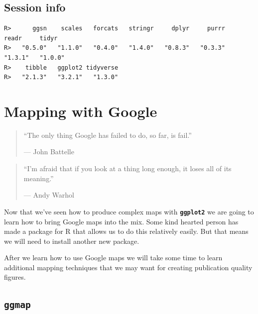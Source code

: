 \documentclass[
]{book}
\newenvironment{Shaded}{\begin{snugshade}}{\end{snugshade}}
\newcommand{\KeywordTok}[1]{\textcolor[rgb]{0.13,0.29,0.53}{\textbf{#1}}}
\newcommand{\NormalTok}[1]{#1}
\newcommand{\OperatorTok}[1]{\textcolor[rgb]{0.81,0.36,0.00}{\textbf{#1}}}
\newcommand{\StringTok}[1]{\textcolor[rgb]{0.31,0.60,0.02}{#1}}
\begin{document}
\hypertarget{session-info-7}{%
\section{Session info}\label{session-info-7}}

\begin{Shaded}
\end{Shaded}

\begin{verbatim}
R>      ggsn    scales   forcats   stringr     dplyr     purrr     readr     tidyr 
R>   "0.5.0"   "1.1.0"   "0.4.0"   "1.4.0"   "0.8.3"   "0.3.3"   "1.3.1"   "1.0.0" 
R>    tibble   ggplot2 tidyverse 
R>   "2.1.3"   "3.2.1"   "1.3.0"
\end{verbatim}

\hypertarget{mapping_google}{%
\chapter{Mapping with Google}\label{mapping_google}}

\begin{quote}
``The only thing Google has failed to do, so far, is fail.''

--- John Battelle
\end{quote}

\begin{quote}
``I'm afraid that if you look at a thing long enough, it loses all of its meaning.''

--- Andy Warhol
\end{quote}

Now that we've seen how to produce complex maps with \textbf{\texttt{ggplot2}} we are going to learn how to bring Google maps into the mix. Some kind hearted person has made a package for R that allows us to do this relatively easily. But that means we will need to install another new package.

After we learn how to use Google maps we will take some time to learn additional mapping techniques that we may want for creating publication quality figures.

\hypertarget{ggmap}{%
\section{\texorpdfstring{\textbf{\texttt{ggmap}}}{ggmap}}\label{ggmap}}
\end{document}
